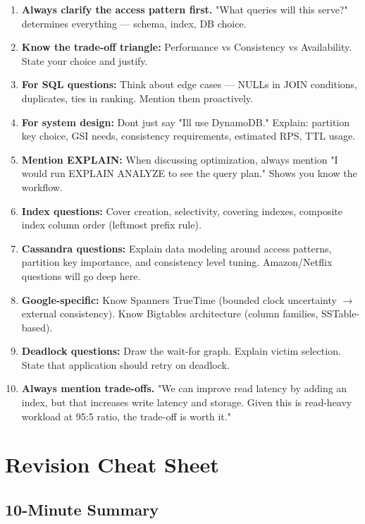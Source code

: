 \documentclass[11pt]{article}
\begin{document}
\begin{enumerate}
\def\labelenumi{\arabic{enumi}.}
\item
  \textbf{Always clarify the access pattern first.} "What queries will this serve?" determines everything --- schema, index, DB choice.
\item
  \textbf{Know the trade-off triangle:} Performance vs Consistency vs Availability. State your choice and justify.
\item
  \textbf{For SQL questions:} Think about edge cases --- NULLs in JOIN conditions, duplicates, ties in ranking. Mention them proactively.
\item
  \textbf{For system design:} Don\textquotesingle t just say "I\textquotesingle ll use DynamoDB." Explain: partition key choice, GSI needs, consistency requirements, estimated RPS, TTL usage.
\item
  \textbf{Mention EXPLAIN:} When discussing optimization, always mention "I would run EXPLAIN ANALYZE to see the query plan." Shows you know the workflow.
\item
  \textbf{Index questions:} Cover creation, selectivity, covering indexes, composite index column order (leftmost prefix rule).
\item
  \textbf{Cassandra questions:} Explain data modeling around access patterns, partition key importance, and consistency level tuning. Amazon/Netflix questions will go deep here.
\item
  \textbf{Google-specific:} Know Spanner\textquotesingle s TrueTime (bounded clock uncertainty \(\rightarrow\) external consistency). Know Bigtable\textquotesingle s architecture (column families, SSTable-based).
\item
  \textbf{Deadlock questions:} Draw the wait-for graph. Explain victim selection. State that application should retry on deadlock.
\item
  \textbf{Always mention trade-offs.} "We can improve read latency by adding an index, but that increases write latency and storage. Given this is read-heavy workload at 95:5 ratio, the trade-off is worth it."
\end{enumerate}

\section{Revision Cheat Sheet}\label{revision-cheat-sheet}

\subsection{10-Minute Summary}\label{10-minute-summary}
\end{document}
